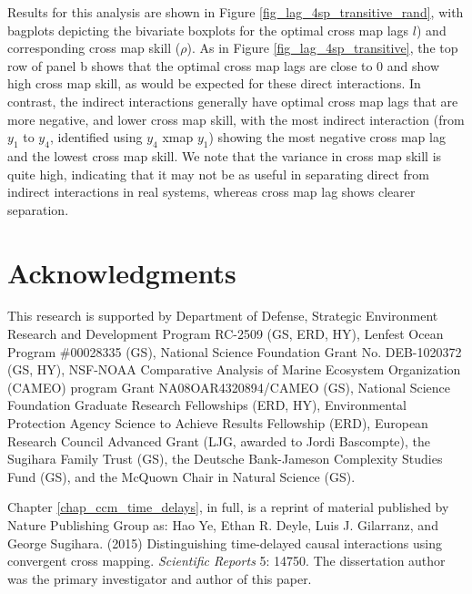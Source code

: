 Results for this analysis are shown in Figure \ref{fig_lag_4sp_transitive_rand}, with bagplots \cite{Rousseeuw_1999} depicting the bivariate boxplots for the optimal cross map lags $l$) and corresponding cross map skill ($\rho$). As in Figure \ref{fig_lag_4sp_transitive}, the top row of panel b shows that the optimal cross map lags are close to 0 and show high cross map skill, as would be expected for these direct interactions. In contrast, the indirect interactions generally have optimal cross map lags that are more negative, and lower cross map skill, with the most indirect interaction (from $y_1$ to $y_4$, identified using $y_4$ xmap $y_1$) showing the most negative cross map lag and the lowest cross map skill. We note that the variance in cross map skill is quite high, indicating that it may not be as useful in separating direct from indirect interactions in real systems, whereas cross map lag shows clearer separation.

\section{Acknowledgments}
This research is supported by Department of Defense, Strategic Environment Research and Development Program RC-2509 (GS, ERD, HY), Lenfest Ocean Program \#00028335 (GS), National Science Foundation Grant No. DEB-1020372 (GS, HY), NSF-NOAA Comparative Analysis of Marine Ecosystem Organization (CAMEO) program Grant NA08OAR4320894/CAMEO (GS), National Science Foundation Graduate Research Fellowships (ERD, HY), Environmental Protection Agency Science to Achieve Results Fellowship (ERD), European Research Council Advanced Grant (LJG, awarded to Jordi Bascompte), the Sugihara Family Trust (GS), the Deutsche Bank-Jameson Complexity Studies Fund (GS), and the McQuown Chair in Natural Science (GS).

Chapter \ref{chap_ccm_time_delays}, in full, is a reprint of material published by Nature Publishing Group as: Hao Ye, Ethan R. Deyle, Luis J. Gilarranz, and George Sugihara. (2015) Distinguishing time-delayed causal interactions using convergent cross mapping. \emph{Scientific Reports} 5: 14750. The dissertation author was the primary investigator and author of this paper.